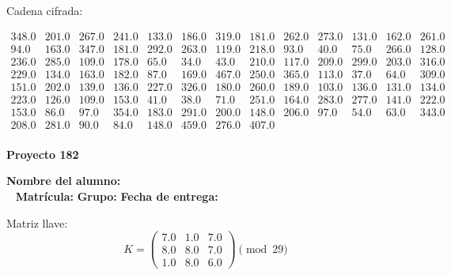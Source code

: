 \documentclass[12pt]{article}
\begin{document}
Cadena cifrada:
\begin{center}
$\begin{array}{lllllllllllll}
348.0 & 201.0 & 267.0 & 241.0 & 133.0 & 186.0 & 319.0 & 181.0 & 262.0 & 273.0 & 131.0 & 162.0 & 261.0\\
94.0 & 163.0 & 347.0 & 181.0 & 292.0 & 263.0 & 119.0 & 218.0 & 93.0 & 40.0 & 75.0 & 266.0 & 128.0\\
236.0 & 285.0 & 109.0 & 178.0 & 65.0 & 34.0 & 43.0 & 210.0 & 117.0 & 209.0 & 299.0 & 203.0 & 316.0\\
229.0 & 134.0 & 163.0 & 182.0 & 87.0 & 169.0 & 467.0 & 250.0 & 365.0 & 113.0 & 37.0 & 64.0 & 309.0\\
151.0 & 202.0 & 139.0 & 136.0 & 227.0 & 326.0 & 180.0 & 260.0 & 189.0 & 103.0 & 136.0 & 131.0 & 134.0\\
223.0 & 126.0 & 109.0 & 153.0 & 41.0 & 38.0 & 71.0 & 251.0 & 164.0 & 283.0 & 277.0 & 141.0 & 222.0\\
153.0 & 86.0 & 97.0 & 354.0 & 183.0 & 291.0 & 200.0 & 148.0 & 206.0 & 97.0 & 54.0 & 63.0 & 343.0\\
208.0 & 281.0 & 90.0 & 84.0 & 148.0 & 459.0 & 276.0 & 407.0\\
\end{array}$
\end{center}

\newpage


\textbf{Proyecto 182}

\textbf{Nombre del alumno:} \underline{\hspace{13cm}}\\\
\vspace{1cm}
\textbf{Matrícula:} \underline{\hspace{4cm}} \hspace{1cm}
\textbf{Grupo:} \underline{\hspace{2cm}}
\textbf{Fecha de entrega:} \underline{\hspace{2cm}}

\medskip

Matriz llave:
\[
K = \begin{pmatrix}
7.0 & 1.0 & 7.0\\
8.0 & 8.0 & 7.0\\
1.0 & 8.0 & 6.0
\end{pmatrix} \pmod{29}
\]
\end{document}
